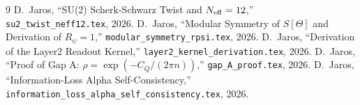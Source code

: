 \documentclass[12pt,a4paper]{article}
\theoremstyle{definition}\newtheorem{definition}[theorem]{Definition}
\theoremstyle{remark}\newtheorem{remark}[theorem]{Remark}
\begin{document}
\begin{thebibliography}{9}
  D.~Jaros, ``SU(2) Scherk-Schwarz Twist and $N_{\rm eff}=12$,''
  \texttt{su2\_twist\_neff12.tex}, 2026.
  D.~Jaros, ``Modular Symmetry of $S[\Theta]$ and Derivation of $R_\psi=1$,''
  \texttt{modular\_symmetry\_rpsi.tex}, 2026.
  D.~Jaros, ``Derivation of the Layer2 Readout Kernel,''
  \texttt{layer2\_kernel\_derivation.tex}, 2026.
  D.~Jaros, ``Proof of Gap A: $\rho=\exp(-C_Q/(2\pi n))$,''
  \texttt{gap\_A\_proof.tex}, 2026.
  D.~Jaros, ``Information-Loss Alpha Self-Consistency,''
  \texttt{information\_loss\_alpha\_self\_consistency.tex}, 2026.
\end{thebibliography}

\ifdefined\INCLUDEMODE\else
\end{document}
